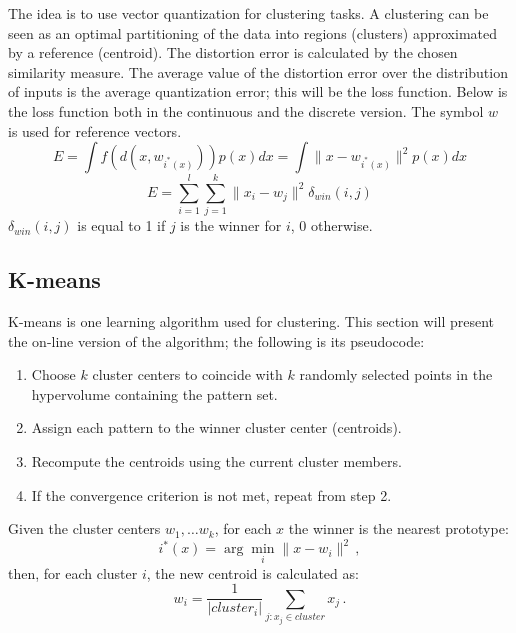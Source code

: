 The idea is to use vector quantization for clustering tasks. A clustering can be seen as an optimal partitioning of the data into regions (clusters) approximated by a reference (centroid). The distortion error is calculated by the chosen similarity measure. The average value of the distortion error over the distribution of inputs is the average quantization error; this will be the loss function. Below is the loss function both in the continuous and the discrete version. The symbol $w$ is used for reference vectors.
\begin{equation*}
    E = \int f(d(x, w_{i^*(x)})) p(x) dx = \int \|x - w_{i^*(x)}\|^2 p(x) dx
\end{equation*}
\begin{equation*}
    E = \sum_{i=1}^l \sum_{j=1}^k \|x_i - w_j \|^2 \delta_{win}(i,j)
\end{equation*}
$\delta_{win}(i,j)$ is equal to 1 if $j$ is the winner for $i$, 0 otherwise.

\subsection{K-means}

K-means is one learning algorithm used for clustering. This section will present the on-line version of the algorithm; the following is its pseudocode:
\begin{enumerate}
    \item Choose $k$ cluster centers to coincide with $k$ randomly selected points in the hypervolume containing the pattern set.

    \item Assign each pattern to the winner cluster center (centroids).

    \item Recompute the centroids using the current cluster members.

    \item If the convergence criterion is not met, repeat from step 2.
\end{enumerate}
Given the cluster centers $w_1, \dots w_k$, for each $x$ the winner is the nearest prototype:
\begin{equation*}
    i^*(x) = \arg \min_i \|x - w_i\|^2 \,,
\end{equation*}
then, for each cluster $i$, the new centroid is calculated as:
\begin{equation*}
    w_i = \dfrac{1}{|cluster_i|} \sum_{j : x_j \in cluster} x_j \,.
\end{equation*}

